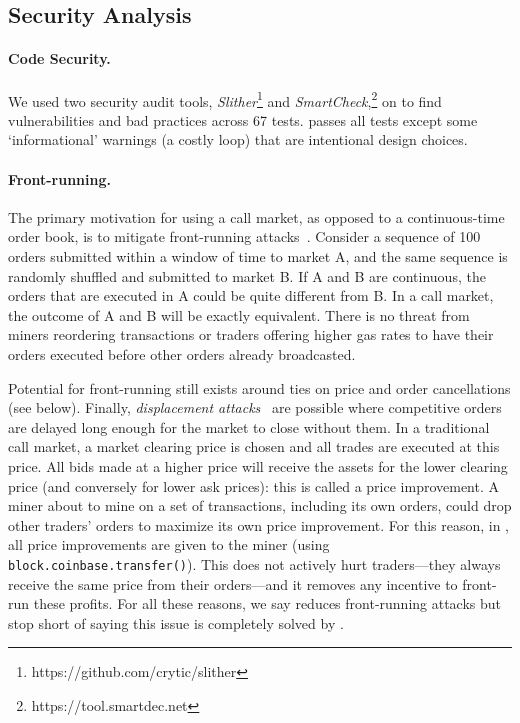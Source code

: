 \subsection{Security Analysis} \label{sec:front}

\paragraph{Code Security.} We used two security audit tools, \textit{Slither}\footnote{https://github.com/crytic/slither} and \textit{SmartCheck},\footnote{https://tool.smartdec.net} on \cm to find vulnerabilities and bad practices across 67 tests. \cm passes all tests except some `informational' warnings (\eg a costly loop) that are intentional design choices.

\paragraph{Front-running.} The primary motivation for using a call market, as opposed to a continuous-time order book, is to mitigate front-running attacks~\cite{clark2014decentralizing,eskandari2019sok,daian2019flash}. Consider a sequence of 100 orders submitted within a window of time to market A, and the same sequence is randomly shuffled and submitted to market B. If A and B are continuous, the orders that are executed in A could be quite different from B. In a call market, the outcome of A and B will be exactly equivalent. There is no threat from miners reordering transactions or traders offering higher gas rates to have their orders executed before other orders already broadcasted. 

Potential for front-running still exists around ties on price and order cancellations (see below). Finally, \textit{displacement attacks}~\cite{eskandari2019sok} are possible where competitive orders are delayed long enough for the market to close without them. In a traditional call market, a market clearing price is chosen and all trades are executed at this price. All bids made at a higher price will receive the assets for the lower clearing price (and conversely for lower ask prices): this is called a price improvement. A miner about to mine on a set of transactions, including its own orders, could drop other traders' orders to maximize its own price improvement. For this reason, in \cm, all price improvements are given to the miner (using \texttt{block.coinbase.transfer()}). This does not actively hurt traders---they always receive the same price from their orders---and it removes any incentive to front-run these profits. For all these reasons, we say \cm reduces front-running attacks but stop short of saying this issue is completely solved by \cm. 

